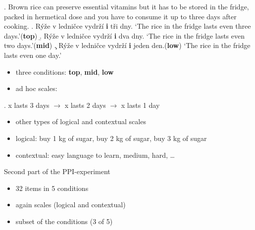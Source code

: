 \documentclass[ignorenonframetext,]{beamer}
\providecommand{\tightlist}{%
  \setlength{\itemsep}{0pt}\setlength{\parskip}{0pt}}
\newcommand{\cond}[1]{\textbf{#1}}
\begin{document}
\begin{frame}

\ex. Brown rice can preserve essential vitamins but it has to be stored
in the fridge, packed in hermetical dose and you have to consume it up
to three days after cooking.\label{ex-1} \a. Rýže v ledničce vydrží
\textbf{i} tři dny. \label{ex-1-a}\newline
`The rice in the fridge lasts even three days.'\hfill (\cond{top}) \b.
Rýže v ledničce vydrží \textbf{i} dva dny.\label{ex-1-b}\newline
`The rice in the fridge lasts even two days.'\hfill (\cond{mid}) \c.
Rýže v ledničce vydrží \textbf{i} jeden
den.\hfill (\cond{low})\label{ex-1-c}\newline
`The rice in the fridge lasts even one day.'

\end{frame}

\begin{frame}

\begin{itemize}
\tightlist
\item
  three conditions: \textbf{top}, \textbf{mid}, \textbf{low}
\item
  ad hoc scales:
\end{itemize}

\ex. x lasts 3 days \(\rightarrow\) x lasts 2 days \(\rightarrow\) x
lasts 1 day

\begin{itemize}
\tightlist
\item
  other types of logical and contextual scales
\item
  logical: buy 1 kg of sugar, buy 2 kg of sugar, buy 3 kg of sugar
\item
  contextual: easy language to learn, medium, hard, \ldots
\end{itemize}

\end{frame}

\begin{frame}{Second part of the PPI-experiment}

\begin{itemize}
\tightlist
\item
  32 items in 5 conditions
\item
  again scales (logical and contextual)
\item
  subset of the conditions (3 of 5)
\end{itemize}

\end{frame}
\end{document}

